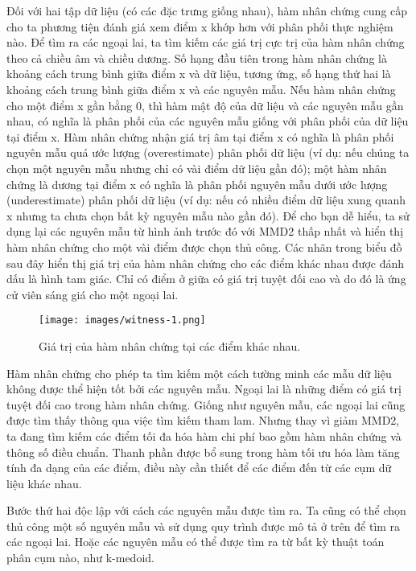 Đối với hai tập dữ liệu (có các đặc trưng giống nhau), hàm nhân chứng cung cấp cho ta phương tiện đánh giá xem điểm x khớp hơn với phân phối thực nghiệm nào. Để tìm ra các ngoại lai, ta tìm kiếm các giá trị cực trị của hàm nhân chứng theo cả chiều âm và chiều dương. Số hạng đầu tiên trong hàm nhân chứng là khoảng cách trung bình giữa điểm x và dữ liệu, tương ứng, số hạng thứ hai là khoảng cách trung bình giữa điểm x và các nguyên mẫu. Nếu hàm nhân chứng cho một điểm x gần bằng 0, thì hàm mật độ của dữ liệu và các nguyên mẫu gần nhau, có nghĩa là phân phối của các nguyên mẫu giống với phân phối của dữ liệu tại điểm x. Hàm nhân chứng nhận giá trị âm tại điểm x có nghĩa là phân phối nguyên mẫu quá ước lượng (overestimate) phân phối dữ liệu (ví dụ: nếu chúng ta chọn một nguyên mẫu nhưng chỉ có vài điểm dữ liệu gần đó); một hàm nhân chứng là dương tại điểm x có nghĩa là phân phối nguyên mẫu dưới ước lượng (underestimate) phân phối dữ liệu (ví dụ: nếu có nhiều điểm dữ liệu xung quanh x nhưng ta chưa chọn bất kỳ nguyên mẫu nào gần đó). Để cho bạn dễ hiểu, ta sử dụng lại các nguyên mẫu từ hình ảnh trước đó với MMD2 thấp nhất và hiển thị hàm nhân chứng cho một vài điểm được chọn thủ công. Các nhãn trong biểu đồ sau đây hiển thị giá trị của hàm nhân chứng cho các điểm khác nhau được đánh dấu là hình tam giác. Chỉ có điểm ở giữa có giá trị tuyệt đối cao và do đó là ứng cử viên sáng giá cho một ngoại lai.

\begin{figure*}[h!]
	\centering
	\texttt{[image: images/witness-1.png]}
    \caption{Giá trị của hàm nhân chứng tại các điểm khác nhau.}
\end{figure*}

Hàm nhân chứng cho phép ta tìm kiếm một cách tường minh các mẫu dữ liệu không được thể hiện tốt bởi các nguyên mẫu. Ngoại lai là những điểm có giá trị tuyệt đối cao trong hàm nhân chứng. Giống như nguyên mẫu, các ngoại lai cũng được tìm thấy thông qua việc tìm kiếm tham lam. Nhưng thay vì giảm MMD2, ta đang tìm kiếm các điểm tối đa hóa hàm chi phí bao gồm hàm nhân chứng và thông số điều chuẩn. Thanh phần được bổ sung trong hàm tối ưu hóa làm tăng tính đa dạng của các điểm, điều này cần thiết để các điểm đến từ các cụm dữ liệu khác nhau.

Bước thứ hai độc lập với cách các nguyên mẫu được tìm ra. Ta cũng có thể chọn thủ công một số nguyên mẫu và sử dụng quy trình được mô tả ở trên để tìm ra các ngoại lai. Hoặc các nguyên mẫu có thể được tìm ra từ bất kỳ thuật toán phân cụm nào, như k-medoid.

